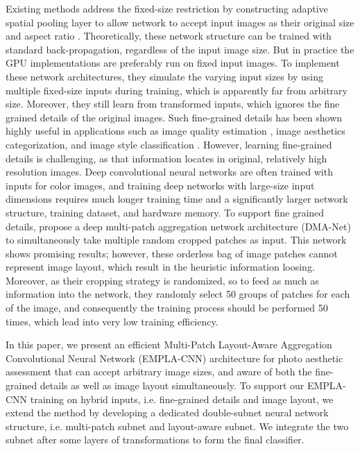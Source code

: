 \documentclass[10pt,twocolumn,letterpaper]{article}
\begin{document}
Existing methods address the fixed-size restriction by constructing
adaptive spatial pooling layer to allow network to accept input images 
as their original size and aspect ratio \cite{SPP} \cite{cvpr:2016}.
Theoretically, these network structure can be trained with standard
back-propagation, regardless of the input image size. But in practice the 
GPU implementations are preferably run on fixed input images. To implement 
these network architectures, they simulate the varying input sizes by using 
multiple fixed-size inputs during training, which is apparently 
far from arbitrary size. Moreover, they still learn from 
transformed inputs, which ignores the fine grained details of the 
original images.
Such fine-grained details has been shown highly
useful in applications such as image quality estimation 
\cite{Kang:2014:CNN:2679600.2680212},
image aesthetics categorization, and image style classification
\cite{Lu:2014:ACMMM}. However, learning fine-grained details is 
challenging, as that information locates in original, relatively 
high resolution images. Deep convolutional neural networks are 
often trained with inputs for color images, and training deep 
networks with large-size input dimensions requires much longer 
training time and a significantly larger network structure, training
dataset, and hardware memory. To support fine grained details, 
\cite{Lu:ICCV } propose a deep multi-patch aggregation network architecture 
(DMA-Net) to simultaneously take multiple random cropped patches
as input. This network shows promising results; however, these orderless
bag of image patches cannot represent image layout, which result in the 
heuristic information loosing. Moreover, as their cropping strategy is 
randomized, so to feed as much as information into the network, they randomly select 50 groups of patches for each of the image, and consequently the training process should be performed 50 times, which lead into very low training efficiency.

In this paper, we present an efficient Multi-Patch Layout-Aware Aggregation 
Convolutional Neural Network (EMPLA-CNN) architecture for photo aesthetic
assessment that can accept arbitrary image sizes, and aware 
of both the fine-grained details as well as image layout simultaneously.
To support our EMPLA-CNN training on hybrid inputs, i.e.
fine-grained details and image layout, we extend the method by developing 
a dedicated double-subnet neural network structure, i.e. multi-patch subnet
and layout-aware subnet. We integrate the two subnet after some layers of 
transformations to form the final classifier.
\end{document}
